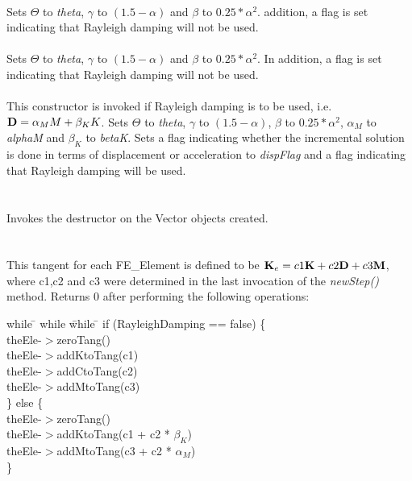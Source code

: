 \\ 
Sets $\Theta$ to {\em theta}, $\gamma$ to $(1.5 - \alpha)$ and $\beta$
to $0.25*\alpha^2$. addition, a flag is set indicating that Rayleigh
damping will not be used. \\ 

\\ 
Sets $\Theta$ to {\em theta}, $\gamma$ to $(1.5 - \alpha)$ and $\beta$
to $0.25*\alpha^2$. In addition, a flag is set indicating that Rayleigh
damping will not be used. \\

\\ 
This constructor is invoked if Rayleigh damping is to be used, 
i.e. ${\bf D} = \alpha_M M + \beta_K K$. Sets $\Theta$ to {\em theta},
$\gamma$ to $(1.5 - \alpha)$, $\beta$ to $0.25*\alpha^2$, $\alpha_M$ to
{\em alphaM} and $\beta_K$ to {\em betaK}. Sets a flag indicating whether the
incremental solution is done in terms of displacement or acceleration
to {\em dispFlag} and a flag indicating that Rayleigh damping will 
be used. \\ 


 \\
\\ 
Invokes the destructor on the Vector objects created. \\

\\
 \\
This tangent for each FE\_Element is defined to be ${\bf K}_e = c1 {\bf K}
+ c2  {\bf D} + c3 {\bf M}$, where c1,c2 and c3 were determined in the last invocation
of the {\em newStep()} method. Returns $0$ after performing the
following operations:  
\begin{tabbing}
while \= \+ while \= while \= \kill
if (RayleighDamping == false) \{ \+ \\
theEle-$>$zeroTang() \\
theEle-$>$addKtoTang(c1) \\
theEle-$>$addCtoTang(c2) \\
theEle-$>$addMtoTang(c3)  \- \\
\} else \{ \+ \\
theEle-$>$zeroTang() \\
theEle-$>$addKtoTang(c1 + c2 * $\beta_K$) \\
theEle-$>$addMtoTang(c3 + c2 * $\alpha_M$)  \- \\ 
\}
\end{tabbing}

